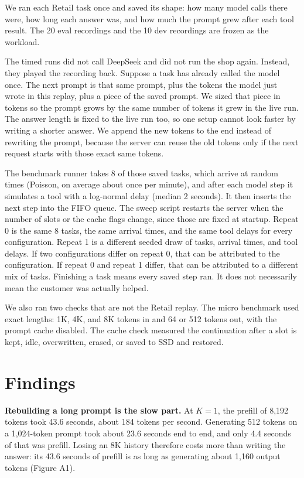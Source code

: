 \documentclass[9pt,twocolumn]{extarticle}
\begin{document}
We ran each Retail task once and saved its shape: how many model calls there were, how long each answer was, and how much the prompt grew after each tool result. The 20 eval recordings and the 10 dev recordings are frozen as the workload.

The timed runs did not call DeepSeek and did not run the shop again. Instead, they played the recording back. Suppose a task has already called the model once. The next prompt is that same prompt, plus the tokens the model just wrote in this replay, plus a piece of the saved prompt. We sized that piece in tokens so the prompt grows by the same number of tokens it grew in the live run. The answer length is fixed to the live run too, so one setup cannot look faster by writing a shorter answer. We append the new tokens to the end instead of rewriting the prompt, because the server can reuse the old tokens only if the next request starts with those exact same tokens.

The benchmark runner takes 8 of those saved tasks, which arrive at random times (Poisson, on average about once per minute), and after each model step it simulates a tool with a log-normal delay (median 2 seconds). It then inserts the next step into the FIFO queue. The sweep script restarts the server when the number of slots or the cache flags change, since those are fixed at startup. Repeat 0 is the same 8 tasks, the same arrival times, and the same tool delays for every configuration. Repeat 1 is a different seeded draw of tasks, arrival times, and tool delays. If two configurations differ on repeat 0, that can be attributed to the configuration. If repeat 0 and repeat 1 differ, that can be attributed to a different mix of tasks. Finishing a task means every saved step ran. It does not necessarily mean the customer was actually helped.

We also ran two checks that are not the Retail replay. The micro benchmark used exact lengths: 1K, 4K, and 8K tokens in and 64 or 512 tokens out, with the prompt cache disabled. The cache check measured the continuation after a slot is kept, idle, overwritten, erased, or saved to SSD and restored.

\section{Findings}

\textbf{Rebuilding a long prompt is the slow part.} At $K = 1$, the prefill of 8,192 tokens took 43.6 seconds, about 184 tokens per second. Generating 512 tokens on a 1,024-token prompt took about 23.6 seconds end to end, and only 4.4 seconds of that was prefill. Losing an 8K history therefore costs more than writing the answer: its 43.6 seconds of prefill is as long as generating about 1,160 output tokens (Figure A1).
\end{document}
